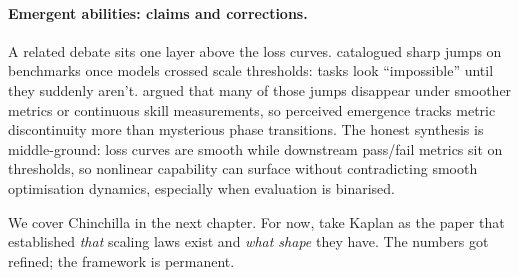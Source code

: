 \paragraph{Emergent abilities: claims and corrections.}
A related debate sits one layer above the loss curves. \citet{wei2022emergent}
catalogued sharp jumps on benchmarks once models crossed scale thresholds:
tasks look ``impossible'' until they suddenly aren't.
\citet{schaeffer2023emergentmirage} argued that many of those jumps disappear
under smoother metrics or continuous skill measurements, so perceived
emergence tracks metric discontinuity more than mysterious phase transitions.
The honest synthesis is middle-ground: loss curves are smooth while downstream
pass/fail metrics sit on thresholds, so nonlinear capability can surface
without contradicting smooth optimisation dynamics, especially when
evaluation is binarised.

We cover Chinchilla in the next chapter. For now, take Kaplan as the paper
that established \emph{that} scaling laws exist and \emph{what shape} they
have. The numbers got refined; the framework is permanent.

